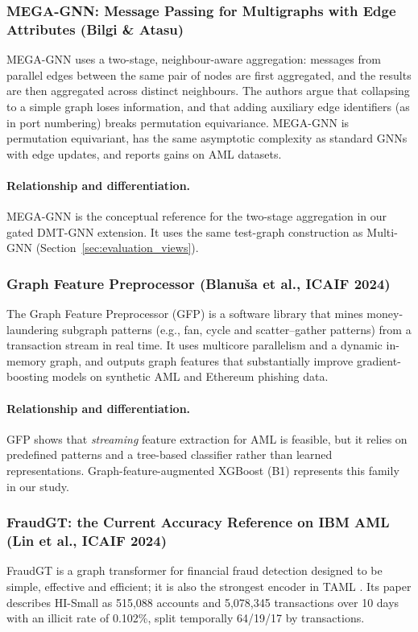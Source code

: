 \documentclass[11pt,a4paper]{article}
\begin{document}
\subsubsection{MEGA-GNN: Message Passing for Multigraphs with Edge Attributes (Bilgi \& Atasu)}
MEGA-GNN \cite{bilgi2026mega} uses a two-stage, neighbour-aware aggregation: messages from parallel edges between the same pair of nodes are first aggregated, and the results are then aggregated across distinct neighbours. The authors argue that collapsing to a simple graph loses information, and that adding auxiliary edge identifiers (as in port numbering) breaks permutation equivariance. MEGA-GNN is permutation equivariant, has the same asymptotic complexity as standard GNNs with edge updates, and reports gains on AML datasets.

\paragraph{Relationship and differentiation.} MEGA-GNN is the conceptual reference for the two-stage aggregation in our gated DMT-GNN extension. It uses the same test-graph construction as Multi-GNN (Section~\ref{sec:evaluation_views}).

\subsubsection{Graph Feature Preprocessor (Blanu\v{s}a et al., ICAIF 2024)}
The Graph Feature Preprocessor (GFP) \cite{blanusa2024gfp} is a software library that mines money-laundering subgraph patterns (e.g., fan, cycle and scatter--gather patterns) from a transaction stream in real time. It uses multicore parallelism and a dynamic in-memory graph, and outputs graph features that substantially improve gradient-boosting models on synthetic AML and Ethereum phishing data.

\paragraph{Relationship and differentiation.} GFP shows that \emph{streaming} feature extraction for AML is feasible, but it relies on predefined patterns and a tree-based classifier rather than learned representations. Graph-feature-augmented XGBoost (B1) represents this family in our study.

\subsubsection{FraudGT: the Current Accuracy Reference on IBM AML (Lin et al., ICAIF 2024)}
FraudGT \cite{lin2024fraudgt} is a graph transformer for financial fraud detection designed to be simple, effective and efficient; it is also the strongest encoder in TAML \cite{rico2026taml}. Its paper describes HI-Small as 515,088 accounts and 5,078,345 transactions over 10 days with an illicit rate of 0.102\%, split temporally 64/19/17 by transactions.
\end{document}
